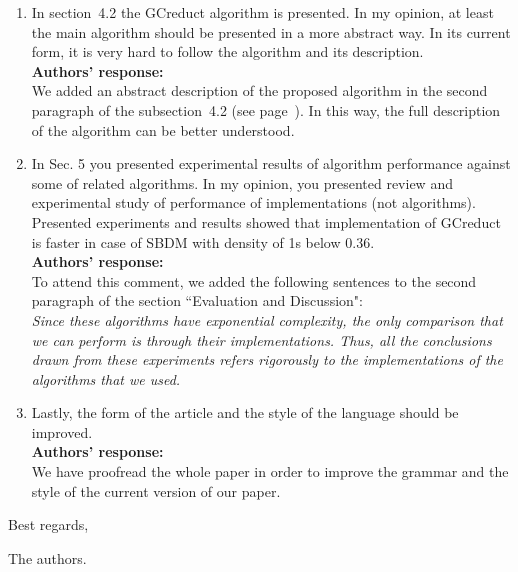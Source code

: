 \documentclass{letter}
\begin{document}
\begin{letter}{}
\begin{enumerate}
	\item In section~4.2 the GCreduct algorithm is presented. In my opinion, at least the main algorithm should be presented in a more abstract way. In its current form, it is very hard to follow the algorithm and its description.\\
	\textbf{Authors’ response:}\\
	We added an abstract description of the proposed algorithm in the second paragraph of the subsection~4.2 (see page~\pageref{abstarct}). In this way, the full description of the algorithm can be better understood.

	\item In Sec. 5 you presented experimental results of algorithm performance against some of related algorithms. In my opinion, you presented review and experimental  study of performance of implementations (not algorithms). Presented experiments and results showed that implementation of GCreduct is faster in case of SBDM with density of 1s below 0.36.\\
	\textbf{Authors’ response:}\\
	To attend this comment, we added the following sentences to the second paragraph of the section ``Evaluation and Discussion":\\
	\textit{Since these algorithms have exponential complexity, the only comparison that we can perform is through their implementations. Thus, all the conclusions drawn from these experiments refers rigorously to the implementations of the algorithms that we used.}
	
	\item Lastly, the form of the article and the style of the language should be improved.\\
	\textbf{Authors’ response:}\\
	We have proofread the whole paper in order to improve the grammar and the style of the current version of our paper.
	
	
  \end{enumerate}     
  
  Best regards,

  The authors.
  
\end{letter}
\end{document}
